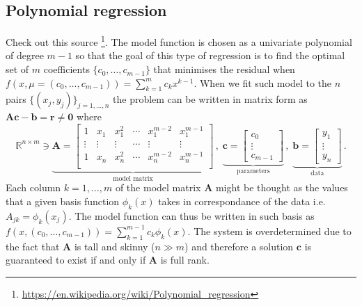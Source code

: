 \documentclass[../main.tex]{subfiles}
\begin{document}
\subsection{Polynomial regression}\label{subsec:pol_regression}
Check out this source \footnote{\url{https://en.wikipedia.org/wiki/Polynomial_regression}}.
The model function is chosen as a univariate polynomial of degree $m-1$ so that the goal of this type of regression is to find the optimal set of $m$ coefficients $\{c_{0},\dots,c_{m-1}\}$ that minimises the residual when $f(x,\mu=(c_{0},\dots,c_{m-1})) = \sum_{k=1}^{m}c_{k}x^{k-1}$.
When we fit such model to the $n$ pairs $\{(x_{j},y_{j})\}_{j=1,\dots,n}$ the problem can be written in matrix form as $\boldsymbol{Ac}-\boldsymbol{b}=\boldsymbol{r}\neq \boldsymbol{0}$ where
\begin{equation*}
        \mathbb{R}^{n\times m}\ni\underbrace{\boldsymbol{A} = \begin{bmatrix}
                        1 & x_{1} & x_{1}^{2} & \cdots & x_{1}^{m-2} & x_{1}^{m-1} \\
                        \vdots &\vdots & \vdots & \cdots & \vdots & \vdots \\
                        1 & x_{n} & x_{n}^{2} & \cdots & x_{n}^{m-2} & x_{n}^{m-1} \\
        \end{bmatrix}}_{\text{model matrix}}\,,\;\underbrace{\boldsymbol{c} = \begin{bmatrix}
                c_{0} \\
                \vdots \\
                c_{m-1}
        \end{bmatrix}}_{\text{parameters}}\,,\;\underbrace{\boldsymbol{b} = \begin{bmatrix}
                y_{1} \\
                \vdots \\
                y_{n}
\end{bmatrix}}_{\text{data}}\,.
\end{equation*}
Each column $k=1,\dots,m$ of the model matrix $\boldsymbol{A}$ might be thought as the values that a given basis function $\phi_{k}(x)$ takes in correspondance of the data i.e. $A_{jk} = \phi_{k}(x_{j})$.
The model function can thus be written in such basis as $f(x, (c_{0},\dots,c_{m-1})) = \sum_{k=1}^{m-1}c_{k}\phi_{k}(x)$.
The system is overdetermined due to the fact that $\boldsymbol{A}$ is tall and skinny ($n\gg m$) and therefore a solution $\boldsymbol{c}$ is guaranteed to exist if and only if $\boldsymbol{A}$ is full rank.
\end{document}
